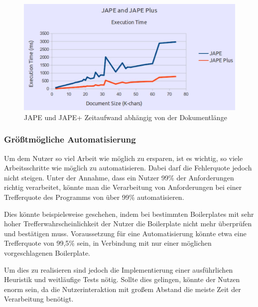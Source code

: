 \documentclass[12pt]{report}
\begin{document}
\begin{figure}[H]
\begin{center}
\includegraphics[scale=0.7]{Bilder/TransducerTest.jpg}
\caption{JAPE und JAPE+ Zeitaufwand abhängig von der Dokumentlänge \cite{gm19}}
\end{center}
\end{figure}

\subsubsection{Größtmögliche Automatisierung}
Um dem Nutzer so viel Arbeit wie möglich zu ersparen, ist es wichtig, so viele Arbeitsschritte wie möglich zu automatisieren. Dabei darf die Fehlerquote jedoch nicht steigen. Unter der Annahme, dass ein Nutzer 99\% der Anforderungen richtig verarbeitet, könnte man die Verarbeitung von Anforderungen bei einer Trefferquote des Programms von über 99\% automatisieren.

Dies könnte beispielsweise geschehen, indem bei bestimmten Boilerplates mit sehr hoher Trefferwahrscheinlichkeit der Nutzer die Boilerplate nicht mehr überprüfen und bestätigen muss. Voraussetzung für eine Automatisierung könnte etwa eine Trefferquote von 99,5\% sein, in Verbindung mit nur einer möglichen vorgeschlagenen Boilerplate.

Um dies zu realisieren sind jedoch die Implementierung einer ausführlichen Heuristik und weitläufige Tests nötig. Sollte dies gelingen, könnte der Nutzen enorm sein, da die Nutzerinteraktion mit großem Abstand die meiste Zeit der Verarbeitung benötigt.
\end{document}
